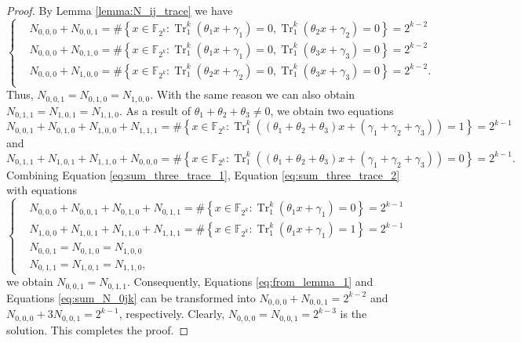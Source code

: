 \documentclass{article}
\newcommand{\F}{\mathbb{F}}
\newcommand{\0}{\textbf{0}}
\newcommand{\1}{\textbf{1}}
\newcommand{\TRACE}{\operatorname{Tr}_1^k}
\theoremstyle{plain}
\begin{document}
    \begin{proof}
        By Lemma \ref{lemma:N_ij_trace} we have
        \begin{equation}\label{eq:from_lemma_1}\left\{\begin{alignedat}{3}
        &N_{0,0,0}+N_{0,0,1}=\#\left\{x\in\F_{2^k} : \TRACE\left(\theta_1x+\gamma_1\right)=0, \TRACE\left(\theta_2x+\gamma_2\right)=0\right\}=2^{k-2}\\
        &N_{0,0,0}+N_{0,1,0}=\#\left\{x\in\F_{2^k} : \TRACE\left(\theta_1x+\gamma_1\right)=0, \TRACE\left(\theta_3x+\gamma_3\right)=0\right\}=2^{k-2}\\
        &N_{0,0,0}+N_{1,0,0}=\#\left\{x\in\F_{2^k} : \TRACE\left(\theta_2x+\gamma_2\right)=0, \TRACE\left(\theta_3x+\gamma_3\right)=0\right\}=2^{k-2}.\\
        \end{alignedat}\right.\end{equation}
        Thus, $N_{0,0,1}=N_{0,1,0}=N_{1,0,0}$. With the same reason we can also obtain  $N_{0,1,1}=N_{1,0,1}=N_{1,1,0}$.
        As a result of $\theta_1+\theta_2+\theta_3\ne 0$, we obtain two equations
        \begin{equation}\label{eq:sum_three_trace_1}
            N_{0,0,1}+N_{0,1,0}+N_{1,0,0}+N_{1,1,1}=\#\left\{x\in\F_{2^k} : \TRACE\left(\left(\theta_1+\theta_2+\theta_3\right)x+\left(\gamma_1+\gamma_2+\gamma_3\right)\right)=1\right\}=2^{k-1}
        \end{equation}
        and
        \begin{equation}\label{eq:sum_three_trace_2}
            N_{0,1,1}+N_{1,0,1}+N_{1,1,0}+N_{0,0,0}=\#\left\{x\in\F_{2^k} : \TRACE\left(\left(\theta_1+\theta_2+\theta_3\right)x+\left(\gamma_1+\gamma_2+\gamma_3\right)\right)=0\right\}=2^{k-1}.
        \end{equation}
        Combining Equation \eqref{eq:sum_three_trace_1}, Equation \eqref{eq:sum_three_trace_2} with equations
        \begin{equation}\label{eq:sum_N_0jk}\left\{\begin{alignedat}{2}
            &N_{0,0,0}+N_{0,0,1}+N_{0,1,0}+N_{0,1,1}=\#\left\{x\in\F_{2^k} : \TRACE\left(\theta_1x+\gamma_1\right)=0\right\}=2^{k-1}\\
            &N_{1,0,0}+N_{1,0,1}+N_{1,1,0}+N_{1,1,1}=\#\left\{x\in\F_{2^k} : \TRACE\left(\theta_1x+\gamma_1\right)=1\right\}=2^{k-1}\\
            &N_{0,0,1}=N_{0,1,0}=N_{1,0,0}\\
            &N_{0,1,1}=N_{1,0,1}=N_{1,1,0},
        \end{alignedat}\right.\end{equation}
        we obtain $N_{0,0,1}=N_{0,1,1}$.
        Consequently, Equations \eqref{eq:from_lemma_1} and Equations \eqref{eq:sum_N_0jk} can be transformed into
        $N_{0,0,0}+N_{0,0,1}=2^{k-2}$ and $N_{0,0,0}+3N_{0,0,1}=2^{k-1}$, respectively.
        Clearly, $N_{0,0,0}=N_{0,0,1}=2^{k-3}$ is the solution. This completes the proof.
    \end{proof}
\end{document}
